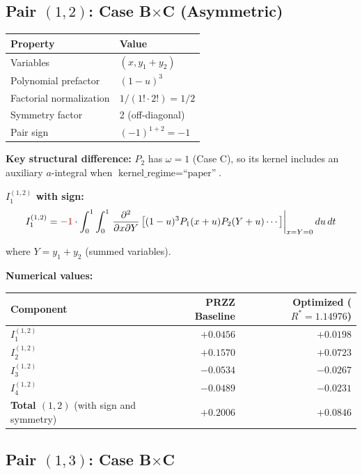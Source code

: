 \documentclass[11pt]{article}
\begin{document}
\subsection{Pair $(1,2)$: Case B$\times$C (Asymmetric)}

\begin{center}
\begin{tabular}{ll}
\toprule
Property & Value \\
\midrule
Variables & $(x, y_1+y_2)$ \\
Polynomial prefactor & $(1-u)^3$ \\
Factorial normalization & $1/(1! \cdot 2!) = 1/2$ \\
Symmetry factor & 2 (off-diagonal) \\
Pair sign & $(-1)^{1+2} = -1$ \\
\bottomrule
\end{tabular}
\end{center}

\textbf{Key structural difference:} $P_2$ has $\omega = 1$ (Case C), so its kernel includes an auxiliary $a$-integral when $\text{kernel\_regime} = \text{``paper''}$.

\textbf{$I_1^{(1,2)}$ with sign:}
\begin{equation}
I_1^{(1,2)} = \textcolor{signflip}{-1} \cdot \int_0^1 \int_0^1 \left.\frac{\partial^2}{\partial x \partial Y}\left[(1-u)^3 P_1(x+u) P_2(Y+u) \cdots\right]\right|_{x=Y=0} du\, dt
\end{equation}

where $Y = y_1 + y_2$ (summed variables).

\textbf{Numerical values:}

\begin{center}
\begin{tabular}{lrr}
\toprule
Component & PRZZ Baseline & Optimized ($R^*=1.14976$) \\
\midrule
$I_1^{(1,2)}$ & $+0.0456$ & $+0.0198$ \\
$I_2^{(1,2)}$ & $+0.1570$ & $+0.0723$ \\
$I_3^{(1,2)}$ & $-0.0534$ & $-0.0267$ \\
$I_4^{(1,2)}$ & $-0.0489$ & $-0.0231$ \\
\midrule
\textbf{Total $(1,2)$} (with sign and symmetry) & $+0.2006$ & $+0.0846$ \\
\bottomrule
\end{tabular}
\end{center}

\subsection{Pair $(1,3)$: Case B$\times$C}
\end{document}
